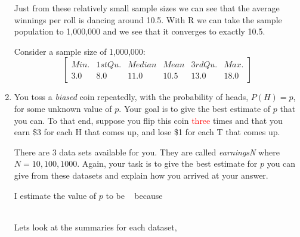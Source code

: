 \documentclass{report}
\begin{document}
\begin{enumerate}
Just from these relatively small sample sizes we can see that the average winnings per roll is dancing around 10.5. With R we can take the sample population to 1,000,000 and we see that it converges to exactly 10.5.

Consider a sample size of 1,000,000:\\
\begin{equation}
\begin{bmatrix}
   Min.&1st Qu.&Median&Mean&3rd Qu.&Max.\\
   3.0&8.0&11.0&10.5&13.0&18.0 
\end{bmatrix}
\end{equation}









%
%
%
%
%
%
%

\newpage

\item  You toss a \emph{biased} coin repeatedly, with the probability of
heads, $P (H) = p$, for some unknown value of $p$.  Your goal is to
give the best estimate of $p$ that you can.  To that end, suppose you
flip this coin \textcolor{red}{three} times and that you earn \$3 for each H that comes up, 
and lose \$1 for each T that comes up.

There are 3 data sets available for you.  They are called
\emph{earningsN} where $N = 10, 100, 1000$.
Again, your task is to give the best estimate for $p$ you can give from
these datasets and explain how you arrived at your answer.

\smallskip

I estimate the value of $p$ to be \underline{\hskip 2cm} ~ because\\\

Lets look at the summaries for each dataset,\\


\end{enumerate}
\end{document}
